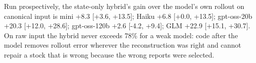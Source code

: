 Run prospectively, the state-only hybrid's gain over the model's own rollout on canonical input is mini +8.3 [+3.6, +13.5]; Haiku +6.8 [+0.0, +13.5]; gpt-oss-20b +20.3 [+12.0, +28.6]; gpt-oss-120b +2.6 [-4.2, +9.4]; GLM +22.9 [+15.1, +30.7]. On raw input the hybrid never exceeds 78\% for a weak model: code after the model removes rollout error wherever the reconstruction was right and cannot repair a stock that is wrong because the wrong reports were selected.
